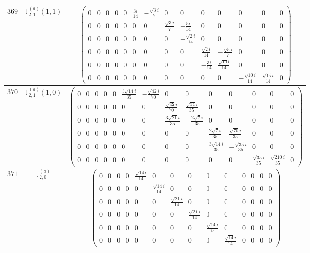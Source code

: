 \documentclass[fleqn,8pt,landscape]{jsarticle}
\begin{document}
\begin{center}
\begin{longtable}{ccc}
$ 369 $ & $ \mathbb{T}_{2,1}^{(a)}(1,1) $ & $ \begin{pmatrix} 0 & 0 & 0 & 0 & 0 & \frac{3 i}{14} & - \frac{\sqrt{3} i}{7} & 0 & 0 & 0 & 0 & 0 & 0 & 0 \\ 0 & 0 & 0 & 0 & 0 & 0 & 0 & \frac{\sqrt{3} i}{7} & - \frac{5 i}{14} & 0 & 0 & 0 & 0 & 0 \\ 0 & 0 & 0 & 0 & 0 & 0 & 0 & 0 & - \frac{\sqrt{2} i}{14} & 0 & 0 & 0 & 0 & 0 \\ 0 & 0 & 0 & 0 & 0 & 0 & 0 & 0 & 0 & \frac{\sqrt{2} i}{14} & - \frac{\sqrt{5} i}{7} & 0 & 0 & 0 \\ 0 & 0 & 0 & 0 & 0 & 0 & 0 & 0 & 0 & - \frac{3 i}{14} & \frac{\sqrt{10} i}{14} & 0 & 0 & 0 \\ 0 & 0 & 0 & 0 & 0 & 0 & 0 & 0 & 0 & 0 & 0 & - \frac{\sqrt{10} i}{14} & \frac{\sqrt{15} i}{14} & 0 \end{pmatrix} $ \\ \hline
$ 370 $ & $ \mathbb{T}_{2,1}^{(a)}(1,0) $ & $ \begin{pmatrix} 0 & 0 & 0 & 0 & 0 & \frac{3 \sqrt{14} i}{35} & - \frac{\sqrt{42} i}{70} & 0 & 0 & 0 & 0 & 0 & 0 & 0 \\ 0 & 0 & 0 & 0 & 0 & 0 & 0 & \frac{\sqrt{42} i}{70} & \frac{\sqrt{14} i}{35} & 0 & 0 & 0 & 0 & 0 \\ 0 & 0 & 0 & 0 & 0 & 0 & 0 & \frac{3 \sqrt{21} i}{35} & - \frac{2 \sqrt{7} i}{35} & 0 & 0 & 0 & 0 & 0 \\ 0 & 0 & 0 & 0 & 0 & 0 & 0 & 0 & 0 & \frac{2 \sqrt{7} i}{35} & \frac{\sqrt{70} i}{35} & 0 & 0 & 0 \\ 0 & 0 & 0 & 0 & 0 & 0 & 0 & 0 & 0 & \frac{3 \sqrt{14} i}{35} & - \frac{\sqrt{35} i}{35} & 0 & 0 & 0 \\ 0 & 0 & 0 & 0 & 0 & 0 & 0 & 0 & 0 & 0 & 0 & \frac{\sqrt{35} i}{35} & \frac{\sqrt{210} i}{35} & 0 \end{pmatrix} $ \\ \hline
$ 371 $ & $ \mathbb{T}_{2,0}^{(a)} $ & $ \begin{pmatrix} 0 & 0 & 0 & 0 & \frac{\sqrt{14} i}{14} & 0 & 0 & 0 & 0 & 0 & 0 & 0 & 0 & 0 \\ 0 & 0 & 0 & 0 & 0 & \frac{\sqrt{14} i}{14} & 0 & 0 & 0 & 0 & 0 & 0 & 0 & 0 \\ 0 & 0 & 0 & 0 & 0 & 0 & \frac{\sqrt{21} i}{14} & 0 & 0 & 0 & 0 & 0 & 0 & 0 \\ 0 & 0 & 0 & 0 & 0 & 0 & 0 & \frac{\sqrt{21} i}{14} & 0 & 0 & 0 & 0 & 0 & 0 \\ 0 & 0 & 0 & 0 & 0 & 0 & 0 & 0 & \frac{\sqrt{14} i}{14} & 0 & 0 & 0 & 0 & 0 \\ 0 & 0 & 0 & 0 & 0 & 0 & 0 & 0 & 0 & \frac{\sqrt{14} i}{14} & 0 & 0 & 0 & 0 \end{pmatrix} $ \\ \hline

\end{longtable}
\end{center}
\end{document}
